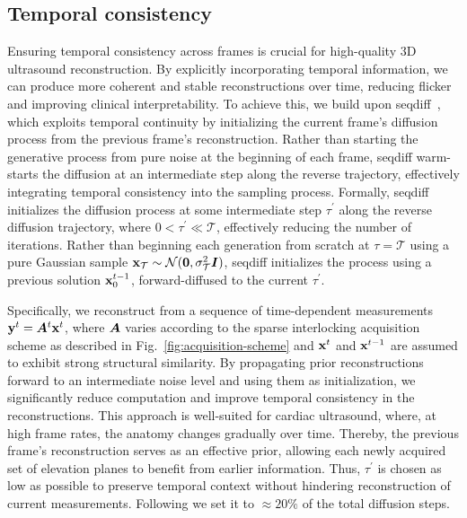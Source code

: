 \documentclass[journal,twoside,web,dvipsnames]{ieeecolor}          %
\begin{document}
\subsection{Temporal consistency}\label{sec:temporal}
Ensuring temporal consistency across frames is crucial for high-quality 3D ultrasound reconstruction. By explicitly incorporating temporal information, we can produce more coherent and stable reconstructions over time, reducing flicker and improving clinical interpretability. To achieve this, we build upon \acrshort{seqdiff}~\cite{stevens2024sequential}, which exploits temporal continuity by initializing the current frame’s diffusion process from the previous frame’s reconstruction. Rather than starting the generative process from pure noise at the beginning of each frame, \acrshort{seqdiff} warm-starts the diffusion at an intermediate step along the reverse trajectory, effectively integrating temporal consistency into the sampling process. Formally, \Acrshort{seqdiff} initializes the diffusion process at some intermediate step $\tau^\prime$ along the reverse diffusion trajectory, where $0 < \tau^\prime \ll \mathcal{T}$, effectively reducing the number of iterations. Rather than beginning each generation from scratch at $\tau = \mathcal{T}$ using a pure Gaussian sample ${\mathbf{x}}_\mathcal{T} \sim \mathcal{N}(\mathbf{0}, \sigma^2_\mathcal{T} {\bm{I}})$, \acrshort{seqdiff} initializes the process using a previous solution ${\mathbf{x}}_0^{t-1}$, forward-diffused to the current $\tau^\prime$.

Specifically, we reconstruct from a sequence of time-dependent measurements ${\mathbf{y}}^t = {\bm{A}}^t {\mathbf{x}}^t$, where ${\bm{A}}$ varies according to the sparse interlocking acquisition scheme as described in Fig.~\ref{fig:acquisition-scheme} and ${\mathbf{x}}^t$ and ${\mathbf{x}}^{t-1}$ are assumed to exhibit strong structural similarity. By propagating prior reconstructions forward to an intermediate noise level and using them as initialization, we significantly reduce computation and improve temporal consistency in the reconstructions. This approach is well-suited for cardiac ultrasound, where, at high frame rates, the anatomy changes gradually over time. Thereby, the previous frame’s reconstruction serves as an effective prior, allowing each newly acquired set of elevation planes to benefit from earlier information. Thus, $\tau^\prime$ is chosen as low as possible to preserve temporal context without hindering reconstruction of current measurements. Following \cite{stevens2024sequential} we set it to $\approx 20\%$ of the total diffusion steps.
\end{document}
